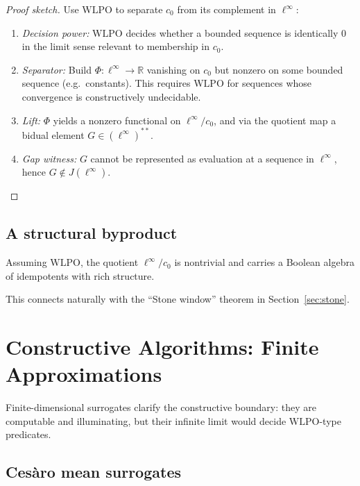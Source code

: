 \documentclass{lmcs}
\newcommand{\R}{\mathbb{R}}
\newcommand{\linf}{\ell^\infty}
\newcommand{\cnull}{c_0}
\newcommand{\WLPO}{\mathrm{WLPO}}
\begin{document}
\begin{proof}[Proof sketch]
Use $\WLPO$ to separate $\cnull$ from its complement in $\linf$:
\begin{enumerate}[label=\arabic*.]
\item \emph{Decision power:} $\WLPO$ decides whether a bounded sequence is identically $0$ in the limit sense relevant to membership in $\cnull$.
\item \emph{Separator:} Build $\Phi:\linf\to\R$ vanishing on $\cnull$ but nonzero on some bounded sequence (e.g.\ constants). This requires $\WLPO$ for sequences whose convergence is constructively undecidable.
\item \emph{Lift:} $\Phi$ yields a nonzero functional on $\linf/\cnull$, and via the quotient map a bidual element $G\in(\linf)^{**}$.
\item \emph{Gap witness:} $G$ cannot be represented as evaluation at a sequence in $\linf$, hence $G\notin J(\linf)$.
\end{enumerate}
\end{proof}

\subsection{A structural byproduct}

\begin{thm}
Assuming $\WLPO$, the quotient $\linf/\cnull$ is nontrivial and carries a Boolean algebra of idempotents with rich structure.
\end{thm}

This connects naturally with the ``Stone window'' theorem in Section~\ref{sec:stone}.

\section{Constructive Algorithms: Finite Approximations}

Finite-dimensional surrogates clarify the constructive boundary: they are computable and illuminating, but their infinite limit would decide $\WLPO$-type predicates.

\subsection{Ces\`aro mean surrogates}
\end{document}
